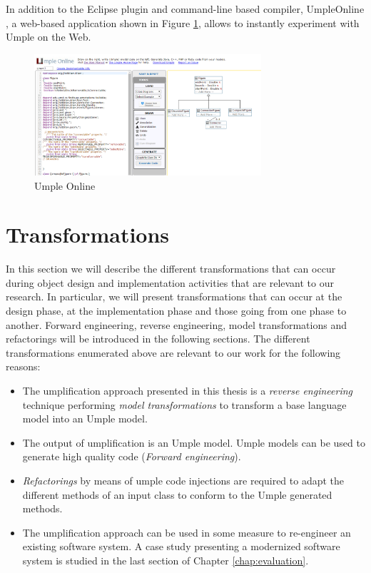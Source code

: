 In addition to the Eclipse plugin and command-line based compiler, UmpleOnline \cite{UmpleOnline}, a web-based application shown in Figure \ref{fig:uonline}, allows to instantly experiment with Umple on the Web. 

\begin{figure}[h]
\centering
\includegraphics[width=0.75\textwidth]{Figures/uonline.png} 
\caption{Umple Online}
\label{fig:uonline}
\end{figure}

\section{Transformations}

In this section we will describe the different transformations that can occur during object design and implementation activities that are relevant to our research. In particular, we will present transformations that can occur at the design phase, at the implementation phase and those going from one phase to another. Forward engineering, reverse engineering, model transformations and refactorings will be introduced in the following sections. The different transformations enumerated above are relevant to our work for the following reasons: 

\begin{itemize}
\item The umplification approach presented in this thesis is a \textit{reverse engineering} technique performing \textit{model transformations} to transform a base language model into an Umple model. 
\item The output of umplification is an Umple model. Umple models can be used to generate high quality code (\textit{Forward engineering}).
\item \textit{Refactorings} by means of umple code injections are required to adapt the different methods of an input class to conform to the Umple generated methods.
\item The umplification approach can be used in some measure to re-engineer an existing software system. A case study presenting a modernized software system is studied in the last section of Chapter \ref{chap:evaluation}.
\end{itemize}

